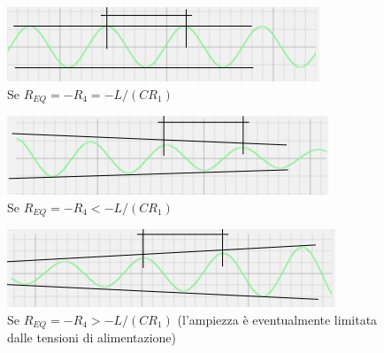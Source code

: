 \documentclass{article}
\begin{document}
\begin{figure}[h]
  \centering
  \includegraphics[scale=0.7]{IM_circuito_risonante_parallelo_attivo_grafico_0}
  \caption{Se $R_{EQ} = -R_4 = -L/(CR_1)$}
  \label{Schema_circuito_risonante_parallelo_attivo_grafico_0}
\end{figure}

\begin{figure}[h]
  \centering
  \includegraphics[scale=0.7]{IM_circuito_risonante_parallelo_attivo_grafico_1}
  \caption{Se $R_{EQ} = -R_4 < -L/(CR_1)$}
  \label{Schema_circuito_risonante_parallelo_attivo_grafico_1}
\end{figure}

\begin{figure}[h]
  \centering
  \includegraphics[scale=0.7]{IM_circuito_risonante_parallelo_attivo_grafico_2}
  \caption{Se $R_{EQ} = -R_4 > -L/(CR_1)$ (l'ampiezza è eventualmente limitata dalle tensioni di alimentazione)}
  \label{Schema_circuito_risonante_parallelo_attivo_grafico_2}
\end{figure}
\end{document}
